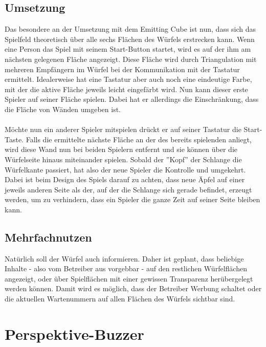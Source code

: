 \documentclass[pdftex,12pt,a4paper]{report}
\begin{document}
\subsection{Umsetzung}
Das besondere an der Umsetzung mit dem Emitting Cube ist nun, dass sich das Spielfeld theoretisch über alle sechs Flächen des Würfels erstrecken kann.
Wenn eine Person das Spiel mit seinem Start-Button startet, wird es auf der ihm am nächsten gelegenen Fläche angezeigt.
Diese Fläche wird durch Triangulation mit mehreren Empfängern im Würfel bei der Kommunikation mit der Tastatur ermittelt.
Idealerweise hat eine Tastatur aber auch noch eine eindeutige Farbe, mit der die aktive Fläche jeweils leicht eingefärbt wird.
Nun kann dieser erste Spieler auf seiner Fläche spielen.
Dabei hat er allerdings die Einschränkung, dass die Fläche von Wänden umgeben ist.\\
\\
Möchte nun ein anderer Spieler mitspielen drückt er auf seiner Tastatur die Start-Taste.
Falls die ermittelte nächste Fläche an der des bereits spielenden anliegt, wird diese Wand nun bei beiden Spielern entfernt und sie können über die Würfelseite hinaus miteinander spielen.
Sobald der ''Kopf'' der Schlange die Würfelkante passiert, hat also der neue Spieler die Kontrolle und umgekehrt.
Dabei ist beim Design des Spiels darauf zu achten, dass neue Äpfel auf einer jeweils anderen Seite als der, 
auf der die Schlange sich gerade befindet, erzeugt werden, um zu verhindern, dass ein Spieler die ganze Zeit auf seiner Seite bleiben kann.

\subsection{Mehrfachnutzen}
Natürlich soll der Würfel auch informieren.
Daher ist geplant, dass beliebige Inhalte - also vom Betreiber aus vorgebbar - 
auf den restlichen Würfelflächen angezeigt, oder über Spielflächen mit einer gewissen Transparenz herübergelegt werden können.
Damit wird es möglich, dass der Betreiber Werbung schaltet oder die aktuellen Wartenummern auf allen Flächen des Würfels sichtbar sind.

\section{Perspektive-Buzzer}
\end{document}
